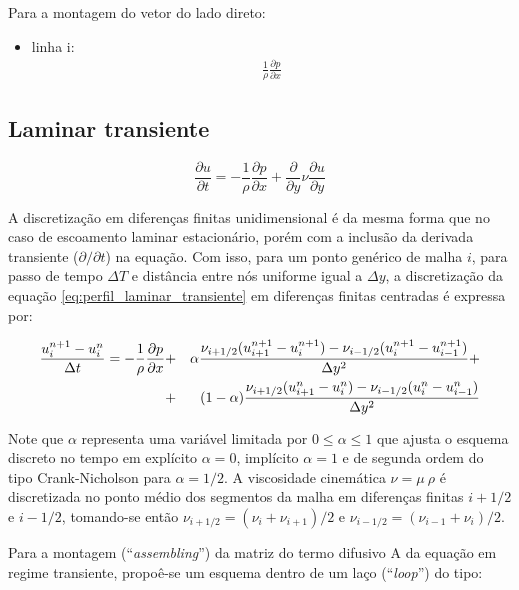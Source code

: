 Para a montagem do vetor do lado direto:

\begin{itemize}
	\item{linha i:}
		\begin{eqnarray}
			\frac{1}{\rho}\frac{\partial p}{\partial x} 
		\end{eqnarray}
\end{itemize}


\subsection{Laminar transiente}

\begin{equation}
	\frac{\partial u}{\partial t}
	=
	- \frac{1}{\rho} \frac{\partial p}{\partial x}
	+ \frac{\partial}{\partial y} \nu \frac{\partial u}{\partial y}
\end{equation}

A discretização em diferenças finitas unidimensional é da mesma forma
que no caso de escoamento laminar estacionário, porém com a inclusão da
derivada transiente ($\partial /\partial t$) na equação. Com isso, para
um ponto genérico de malha $i$, para passo de tempo $\Delta T$ e
distância entre nós uniforme igual a $\Delta y$, a discretização da
equação \ref{eq:perfil_laminar_transiente} em diferenças finitas
centradas é expressa por:

\begin{eqnarray}
  \frac{u_i^{n+1}-u_i^n}{\Delta t} = -\frac{1}{\rho}\frac{\partial p}{\partial x} &+&
  \alpha\frac{\nu_{i+1/2}(u_{i+1}^{n+1}-u_{i}^{n+1})
  -\nu_{i-1/2}(u_{i}^{n+1}-u_{i-1}^{n+1})}{\Delta y^2} +\nonumber\\ &+&
  (1-\alpha)\frac{\nu_{i+1/2}(u_{i+1}^n-u_{i}^n)
  -\nu_{i-1/2}(u_{i}^n-u_{i-1}^n)}{\Delta y^2}
  \label{eq:perfil_turbulento_discr}
\end{eqnarray}

Note que $\alpha$ representa uma variável limitada por $0\leq\alpha\leq
1$ que ajusta o esquema discreto no tempo em explícito $\alpha=0$,
implícito $\alpha=1$ e de segunda ordem do tipo Crank-Nicholson para
$\alpha=1/2$. A viscosidade cinemática $\nu = \mu \ \rho$ é
discretizada no ponto médio dos segmentos da malha em diferenças finitas
$i+1/2$ e $i-1/2$, tomando-se então $\nu_{i+1/2} =
(\nu_{i}+\nu_{i+1})/2$ e $\nu_{i-1/2} = (\nu_{i-1}+\nu_{i})/2$.

Para a montagem (``\emph{assembling}'') da matriz do termo difusivo A da
equação em regime transiente, propoê-se um esquema dentro de um laço
(``\emph{loop}'') do tipo:


